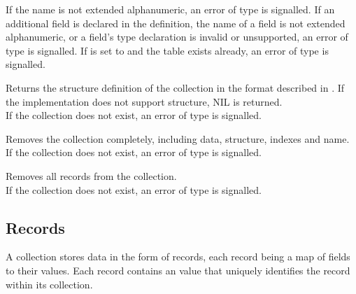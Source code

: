 \noindent If the  name is not extended alphanumeric, an error of type  is signalled. If an additional  field is declared in the  definition, the name of a field is not extended alphanumeric, or a field's type declaration is invalid or unsupported, an error of type  is signalled. If  is set to  and the table exists already, an error of type  is signalled.

Returns the structure definition of the collection in the format described in . If the implementation does not support structure, NIL is returned. \\

\noindent If the collection does not exist, an error of type  is signalled.

Removes the collection completely, including data, structure, indexes and name. \\

\noindent If the collection does not exist, an error of type  is signalled.

Removes all records from the collection. \\

\noindent If the collection does not exist, an error of type  is signalled.

\subsection{Records}
A collection stores data in the form of records, each record being a map of fields to their values. Each record contains an  value that uniquely identifies the record within its collection.

